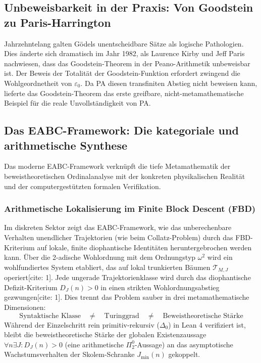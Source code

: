 \documentclass[11pt,a4paper]{article}
\begin{document}
	\subsection{Unbeweisbarkeit in der Praxis: Von Goodstein zu Paris-Harrington}
	Jahrzehntelang galten Gödels unentscheidbare Sätze als logische Pathologien. Dies änderte sich dramatisch im Jahr 1982, als Laurence Kirby und Jeff Paris nachwiesen, dass das Goodstein-Theorem in der Peano-Arithmetik unbeweisbar ist.
	Der Beweis der Totalität der Goodstein-Funktion erfordert zwingend die Wohlgeordnetheit von $\varepsilon_0$. Da PA diesen transfiniten Abstieg nicht beweisen kann, lieferte das Goodstein-Theorem das erste greifbare, nicht-metamathematische Beispiel für die reale Unvollständigkeit von PA.
	
	\subsection{Das EABC-Framework: Die kategoriale und arithmetische Synthese}
	Das moderne EABC-Framework verknüpft die tiefe Metamathematik der beweistheoretischen Ordinalanalyse mit der konkreten physikalischen Realität und der computergestützten formalen Verifikation.
	
	\subsubsection{Arithmetische Lokalisierung im Finite Block Descent (FBD)}
	Im diskreten Sektor zeigt das EABC-Framework, wie das unberechenbare Verhalten unendlicher Trajektorien (wie beim Collatz-Problem) durch das FBD-Kriterium auf lokale, finite diophantische Identitäten heruntergebrochen werden kann.
	Über die 2-adische Wohlordnung mit dem Ordnungstyp $\omega^2$ wird ein wohlfundiertes System etabliert, das auf lokal trunkierten Bäumen $\mathcal{T}_{M,J}$ operiert[cite: 1]. Jede ungerade Trajektorienklasse wird durch das diophantische Defizit-Kriterium $D_J(n) > 0$ in einen strikten Wohlordnungsabstieg gezwungen[cite: 1].
	Dies trennt das Problem sauber in drei metamathematische Dimensionen:
	$$\boxed{\text{Syntaktische Klasse}} \quad\neq\quad \boxed{\text{Turinggrad}} \quad\neq\quad \boxed{\text{Beweistheoretische Stärke}}$$
	Während der Einzelschritt rein primitiv-rekursiv ($\Delta_0$) in Lean 4 verifiziert ist, bleibt die beweistheoretische Stärke der globalen Existenzaussage $\forall n \exists J : D_J(n) > 0$ (eine arithmetische $\Pi^0_2$-Aussage) an das asymptotische Wachstumsverhalten der Skolem-Schranke $J_{\min}(n)$ gekoppelt.
	
\end{document}
